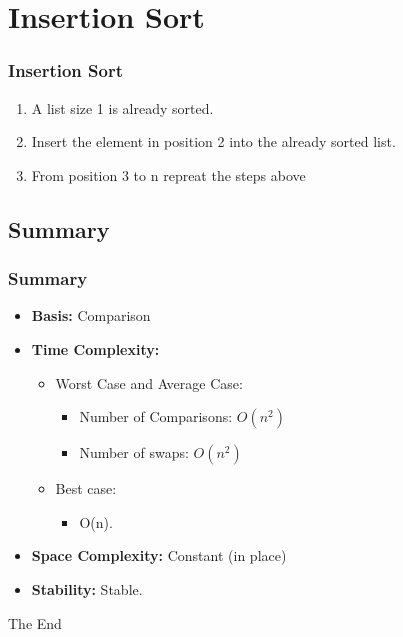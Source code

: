 \documentclass{beamer}
\begin{document}
\section{Insertion Sort}
\begin{frame}
\frametitle{Insertion Sort}
\begin{enumerate}
\item A list size 1 is already sorted.
\item Insert the element in position 2 into the already sorted list.
\item From position 3 to n repreat the steps above
\ins
\end{enumerate}
\end{frame}

\subsection{Summary}
\begin{frame}
\frametitle{Summary}
\begin{itemize}
\item \textbf{Basis:} Comparison
\item \textbf{Time Complexity:}
\begin{itemize}
\item Worst Case and Average Case:
\begin{itemize}
\item Number of Comparisons: $O(n^2)$
\item Number of swaps: $O(n^2)$
\end{itemize}
\item Best case:
\begin{itemize}
\item O(n).
\end{itemize}
\end{itemize}
\item \textbf{Space Complexity:} Constant (in place)
\item \textbf{Stability:} Stable.
\end{itemize}
\end{frame}
\begin{frame} 
\Huge{\centerline{The End}}
\end{frame}
\end{document}
